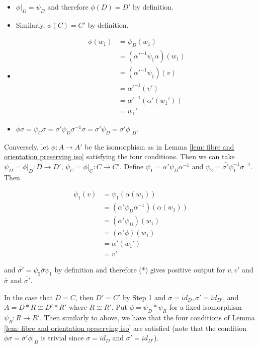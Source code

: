 \documentclass{amsart}
\theoremstyle{plain}
\theoremstyle{definition}
\theoremstyle{remark}
\begin{document}
\begin{itemize}
    \item $\phi|_D = \psi_D$ and therefore $\phi(D) = D'$ by definition.

    \item Similarly, $\phi(C) = C'$ by definition.

    \item
    \begin{align*}
        \phi(w_1) &= \psi_D (w_1)\\
        &= (\alpha'^{-1} \psi_1 \alpha)(w_1)\\
        &= (\alpha'^{-1} \psi_1)(v)\\
        &= \alpha'^{-1} (v')\\
        &= \alpha'^{-1} (\alpha'(w_1'))\\
        &= w_1'
    \end{align*}
    
    \item $\phi \sigma = \psi_C \sigma = \sigma' \psi_D \sigma^{-1} \sigma = \sigma' \psi_D = \sigma' \phi|_D$.
    
\end{itemize}

Conversely, let $\phi : A \to A'$ be the isomorphism as in Lemma \ref{lem: fibre and orientation preserving iso} satisfying the four conditions. Then we can take $\psi_D = \phi|_D : D \to D'$, $\psi_C = \phi|_C : C \to C'$. Define $\psi_1 = \alpha' \psi_D \alpha^{-1}$ and $\psi_2 = \bar{\sigma'} \psi_1^{-1} \bar{\sigma}^{-1}$. Then

\begin{align*}
    \psi_1(v) &= \psi_1(\alpha(w_1))\\
    &= (\alpha' \psi_D \alpha^{-1})(\alpha(w_1))\\
    &= (\alpha' \psi_D)(w_1)\\
    &= (\alpha' \phi)(w_1)\\
    &= \alpha'(w_1')\\
    &= v'
\end{align*}

\noindent and $\bar{\sigma'} = \psi_2 \bar{\sigma} \psi_1$ by definition and therefore (*) gives positive output for $v,v'$ and $\bar{\sigma}$ and $\bar{\sigma'}$. 

In the case that $D = C$, then $D' = C'$ by Step 1 and $\sigma = id_D, \sigma' = id_{D'}$, and $A = D * R \cong D' * R'$ where $R \cong R'$. Put $\phi = \psi_D * \psi_R$ for a fixed isomorphism $\psi_R : R \to R'$. Then similarly to above, we have that the four conditions of Lemma \ref{lem: fibre and orientation preserving iso} are satisfied (note that the condition $\phi \sigma = \sigma' \phi \vert_D$ is trivial since $\sigma = id_D$ and $\sigma' = id_{D'}$).
\end{document}
